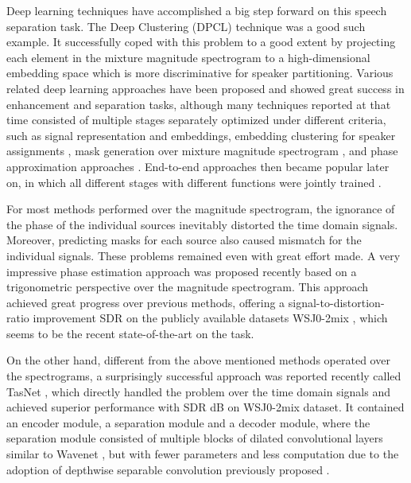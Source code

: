 \documentclass[a4paper]{article}
\begin{document}
Deep learning techniques have accomplished a big step forward on this speech separation task. The Deep Clustering (DPCL) technique \cite{hershey2016deep} was a good such example. It successfully coped with this problem to a good extent by projecting each element in the mixture magnitude spectrogram to a high-dimensional embedding space which is more discriminative for speaker partitioning. Various related deep learning approaches have been proposed and showed great success in enhancement \cite{pascual2017segan, rethage2018wavenet, choi2019phase} and separation \cite{wang2014training, chen2017deep, yu2017permutation, luo2017deep, luo2018tasnet1} tasks, although many techniques reported at that time consisted of multiple stages separately optimized under different criteria, such as signal representation and embeddings, embedding clustering for speaker assignments \cite{hershey2016deep, isik2016single}, mask generation over mixture magnitude spectrogram \cite{wang2014training, luo2018speaker}, and phase approximation approaches \cite{wang2018alternative, wang2018end, wang2018deep}. End-to-end approaches then became popular later on, in which all different stages with different functions were jointly trained \cite{miao2015eesen, chan2015listen}.

For most methods performed over the magnitude spectrogram, the ignorance of the phase of the individual sources inevitably distorted the time domain signals. Moreover, predicting masks for each source also caused mismatch for the individual signals. These problems remained even with great effort made. A very impressive phase estimation approach was proposed recently \cite{wang2018deep} based on a trigonometric perspective over the magnitude spectrogram. This approach achieved great progress over previous methods, offering a signal-to-distortion-ratio improvement SDR on the publicly available datasets WSJ0-2mix \cite{hershey2016deep}, which seems to be the recent state-of-the-art on the task.

On the other hand, different from the above mentioned methods operated over the spectrograms, a surprisingly successful approach was reported recently called TasNet \cite{luo2018tasnet}, which directly handled the problem over the time domain signals and achieved superior performance with SDR dB on WSJ0-2mix dataset. It contained an encoder module, a separation module and a decoder module, where the separation module consisted of multiple blocks of dilated convolutional layers similar to Wavenet \cite{oord2016wavenet}, but with fewer parameters and less computation due to the adoption of depthwise separable convolution previously proposed \cite{howard2017mobilenets}. 
\end{document}
